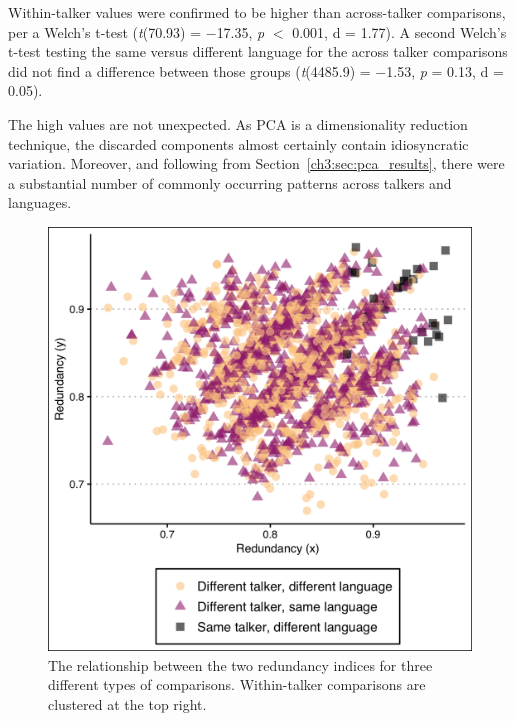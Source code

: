 Within-talker values were confirmed to be higher than across-talker comparisons, per a Welch's t-test (\textit{t}(70.93) = $-$17.35, \textit{p} $<$ 0.001, d = 1.77). A second Welch's t-test testing the same versus different language for the across talker comparisons did not find a difference between those groups (\textit{t}(4485.9) = $-$1.53, \textit{p} = 0.13, d = 0.05). 

The high values are not unexpected. As PCA is a dimensionality reduction technique, the discarded components almost certainly contain idiosyncratic variation. Moreover, and following from Section~\ref{ch3:sec:pca_results}, there were a substantial number of commonly occurring patterns across talkers and languages. 

\begin{figure}[htbp]
\begin{center}
\includegraphics[width=\linewidth]{figures/ch3_redundancy.png} 
\caption{The relationship between the two redundancy indices for three different types of comparisons. Within-talker comparisons are clustered at the top right.}
\label{ch3:fig:redundancy}
\end{center}
\end{figure}


